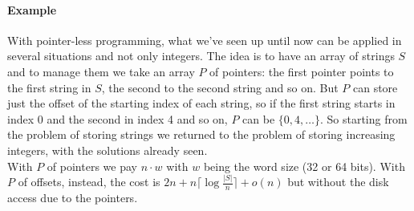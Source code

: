\documentclass[10pt]{report}
\begin{document}
\paragraph{Example} With pointer-less programming, what we've seen up until now can be applied in several situations and not only integers. The idea is to have an array of strings $S$ and to manage them we take an array $P$ of pointers: the first pointer points to the first string in $S$, the second to the second string and so on. But $P$ can store just the offset of the starting index of each string, so if the first string starts in index 0 and the second in index 4 and so on, $P$ can be $\{0,4,\ldots\}$. So starting from the problem of storing strings we returned to the problem of storing increasing integers, with the solutions already seen.\\
With $P$ of pointers we pay $n\cdot w$ with $w$ being the word size (32 or 64 bits). With $P$ of offsets, instead, the cost is $2n+n\lceil\log\frac{|S|}{n}\rceil+o(n)$ but without the disk access due to the pointers.
\end{document}
